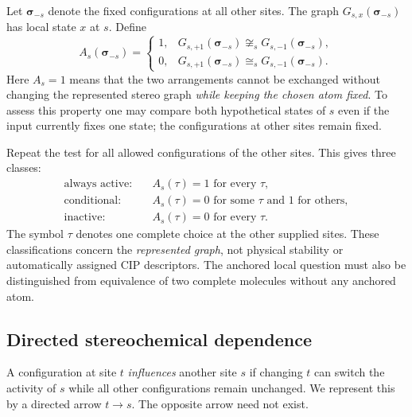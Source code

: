 \documentclass[journal=jcisd8,manuscript=article]{achemso}
\begin{document}
Let $\boldsymbol{\sigma}_{-s}$ denote the fixed
configurations at all other sites.
The graph $G_{s,x}(\boldsymbol{\sigma}_{-s})$ has
local state $x$ at $s$. Define
\begin{equation}
A_s(\boldsymbol{\sigma}_{-s}) =
\begin{cases}
1, & G_{s,+1}(\boldsymbol{\sigma}_{-s})
       \not\cong_s G_{s,-1}(\boldsymbol{\sigma}_{-s}),\\
0, & G_{s,+1}(\boldsymbol{\sigma}_{-s})
       \cong_s G_{s,-1}(\boldsymbol{\sigma}_{-s}).
\end{cases}
\label{eq:activation}
\end{equation}
Here $A_s=1$ means that the two arrangements cannot
be exchanged without changing the represented stereo graph
\emph{while keeping the chosen atom fixed}.
To assess this property one may compare both hypothetical
states of $s$ even if the input currently fixes one state;
the configurations at other sites remain fixed.

Repeat the test for all allowed configurations of the
other sites. This gives three classes:
\begin{equation}
\begin{aligned}
\text{always active:}\quad & A_s(\tau)=1\text{ for every }\tau,\\
\text{conditional:}\quad & A_s(\tau)=0\text{ for some }\tau
                         \text{ and }1\text{ for others},\\
\text{inactive:}\quad & A_s(\tau)=0\text{ for every }\tau .
\end{aligned}
\label{eq:class}
\end{equation}
The symbol $\tau$ denotes one complete choice at the
other supplied sites. These classifications concern the
\emph{represented graph}, not physical stability or
automatically assigned CIP descriptors. The anchored
local question must also be distinguished from equivalence
of two complete molecules without any anchored atom.

\subsection{Directed stereochemical dependence}
\label{subsec:dependency}

A configuration at site $t$ \emph{influences} another site $s$
if changing $t$ can switch the activity of $s$ while all
other configurations remain unchanged. We represent this by
a directed arrow $t\rightarrow s$. The opposite arrow
need not exist.
\end{document}
